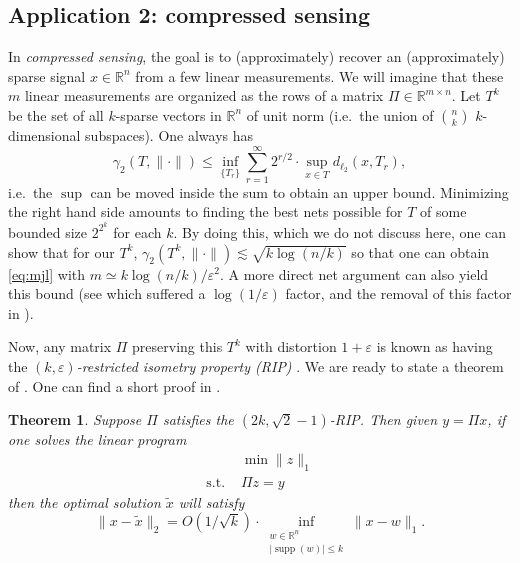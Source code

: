 \documentclass[12pt]{article}
\newcommand{\eps}{\varepsilon}
\newcommand{\R}{\mathbb{R}}
\newtheorem{theorem}{Theorem}
\newcommand{\Eqsub}[1]{\eqref{eq:#1}}
\begin{document}
\subsection{Application 2: compressed sensing}
In {\em compressed sensing}, the goal is to (approximately) recover an (approximately) sparse signal $x\in\R^n$ from a few linear measurements. We will imagine that these $m$ linear measurements are organized as the rows of a matrix $\Pi\in\R^{m\times n}$. Let $T^k$ be the set of all $k$-sparse vectors in $\R^n$ of unit norm (i.e.\ the union of $\binom{n}{k}$ $k$-dimensional subspaces). One always has
$$
\gamma_2(T, \|\cdot\|) \le \inf_{\{T_r\}} \sum_{r=1}^\infty 2^{r/2}\cdot  \sup_{x\in T} d_{\ell_2}(x, T_r) ,
$$
i.e.\ the $\sup$ can be moved inside the sum to obtain an upper bound. Minimizing the right hand side amounts to finding the best nets possible for $T$ of some bounded size $2^{2^k}$ for each $k$. By doing this, which we do not discuss here, one can show that for our $T^k$, $\gamma_2(T^k,\|\cdot\|) \lesssim \sqrt{k\log(n/k)}$ so that one can obtain \Eqsub{mjl} with $m\simeq k\log(n/k)/\eps^2$. A more direct net argument can also yield this bound (see \cite{BaraniukDD08} which suffered a $\log(1/\eps)$ factor, and the removal of this factor in \cite[Theorem 9.12]{FoucartR13}).

Now, any matrix $\Pi$ preserving this $T^k$ with distortion $1+\eps$ is known as having the {\em $(k,\eps)$-restricted isometry property (RIP)} \cite{CandesT06}. We are ready to state a theorem of \cite{CandesT06,Donoho06}. One can find a short proof in \cite{Candes08}.

\begin{theorem}
Suppose $\Pi$ satisfies the $(2k,\sqrt{2}-1)$-RIP. Then given $y = \Pi x$, if one solves the linear program
\begin{align*}
&\min \|z\|_1\\
\text{s.t.\ } & \Pi z = y
\end{align*}
then the optimal solution $\tilde{x}$ will satisfy
$$
\|x - \tilde{x}\|_2 = O(1/\sqrt{k})\cdot \inf_{\substack{w\in\R^n\\ |\mathop{supp}(w)| \le k}}\|x - w\|_1 .
$$
\end{theorem}




\end{document}
